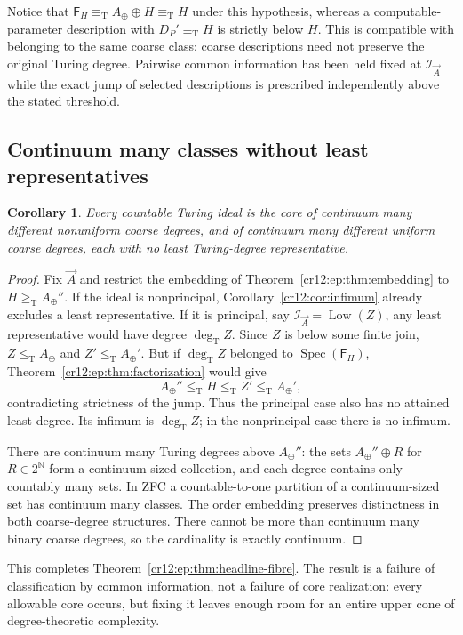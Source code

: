 \documentclass[11pt,letterpaper]{article}
\theoremstyle{plain}
\newtheorem{corollary}[theorem]{Corollary}
\theoremstyle{definition}
\theoremstyle{remark}
\numberwithin{equation}{section}
\newcommand{\N}{\mathbb N}
\newcommand{\Cantor}{2^{\N}}
\newcommand{\leT}{\leq_{\mathrm T}}
\newcommand{\geT}{\geq_{\mathrm T}}
\newcommand{\eqT}{\equiv_{\mathrm T}}
\newcommand{\Low}{\operatorname{Low}}
\newcommand{\Spec}{\operatorname{Spec}}
\newcommand{\degT}{\deg_{\mathrm T}}
\newcommand{\I}{\mathcal I}
\newcommand{\Aplus}{A_{\oplus}}          %
\newcommand{\Fint}{\mathsf F}            %
\begin{document}
Notice that $\Fint_H\eqT \Aplus\oplus H\eqT H$ under this hypothesis, whereas a
computable-parameter description with $D_P'\eqT H$ is strictly below $H$. This is
compatible with belonging to the same coarse class: coarse descriptions need not
preserve the original Turing degree. Pairwise common information has been held fixed
at $\I_{\vec A}$ while the exact jump of selected descriptions is prescribed
independently above the stated threshold.

\subsection{Continuum many classes without least representatives}
\begin{corollary}\label{cr12:ep:cor:continuum}
Every countable Turing ideal is the core of continuum many different nonuniform
coarse degrees, and of continuum many different uniform coarse degrees, each with no
least Turing-degree representative.
\end{corollary}
\begin{proof}
Fix $\vec A$ and restrict the embedding of Theorem~\ref{cr12:ep:thm:embedding} to
$H\geT \Aplus''$. If the ideal is nonprincipal, Corollary~\ref{cr12:cor:infimum}
already excludes a least representative. If it is principal, say
$\I_{\vec A}=\Low(Z)$, any least representative would have degree $\degT Z$. Since
$Z$ is below some finite join, $Z\leT \Aplus$ and $Z'\leT \Aplus'$. But if $\degT Z$
belonged to $\Spec(\Fint_H)$, Theorem~\ref{cr12:ep:thm:factorization} would give
\[
 \Aplus''\leT H\leT Z'\leT \Aplus',
\]
contradicting strictness of the jump. Thus the principal case also has no attained
least degree. Its infimum is $\degT Z$; in the nonprincipal case there is no
infimum.

There are continuum many Turing degrees above $\Aplus''$: the sets $\Aplus''\oplus R$
for $R\in\Cantor$ form a continuum-sized collection, and each degree contains only
countably many sets. In ZFC a countable-to-one partition of a continuum-sized set has
continuum many classes. The order embedding preserves distinctness in both
coarse-degree structures. There cannot be more than continuum many binary coarse
degrees, so the cardinality is exactly continuum.
\end{proof}

This completes Theorem~\ref{cr12:ep:thm:headline-fibre}. The result is a failure of
classification by common information, not a failure of core realization: every
allowable core occurs, but fixing it leaves enough room for an entire upper cone of
degree-theoretic complexity.
\end{document}
